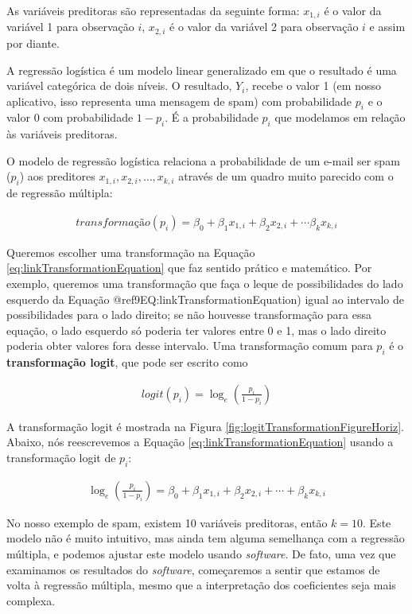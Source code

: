 \documentclass[
]{book}
\theoremstyle{definition}
\theoremstyle{definition}
\theoremstyle{definition}
\theoremstyle{definition}
\theoremstyle{remark}
\begin{document}
As variáveis preditoras são representadas da seguinte forma: \(x_{1,i}\) é o valor da variável 1 para observação \(i\), \(x_{2,i}\) é o valor da variável 2 para observação \(i\) e assim por diante.

A regressão logística é um modelo linear generalizado em que o resultado é uma variável categórica de dois níveis. O resultado, \(Y_i\), recebe o valor 1 (em nosso aplicativo, isso representa uma mensagem de spam) com probabilidade \(p_i\) e o valor 0 com probabilidade \(1-p_i\). É a probabilidade \(p_i\) que modelamos em relação às variáveis preditoras.

O modelo de regressão logística relaciona a probabilidade de um e-mail ser spam (\(p_i\)) aos preditores \(x_{1,i}, x_{2,i}, \dots, x_{k,i}\) através de um quadro muito parecido com o de regressão múltipla:

\begin{align}
transformação(p_{i}) = \beta_0 + \beta_1x_{1,i} + \beta_2 x_{2,i} + \cdots \beta_k x_{k,i}
\label{eq:linkTransformationEquation}
\end{align}

Queremos escolher uma transformação na Equação \eqref{eq:linkTransformationEquation} que faz sentido prático e matemático. Por exemplo, queremos uma transformação que faça o leque de possibilidades do lado esquerdo da Equação @ref9EQ:linkTransformationEquation) igual ao intervalo de possibilidades para o lado direito; se não houvesse transformação para essa equação, o lado esquerdo só poderia ter valores entre 0 e 1, mas o lado direito poderia obter valores fora desse intervalo. Uma transformação comum para \(p_i\) é o \textbf{transformação logit}, que pode ser escrito como

\begin{align*}
logit(p_i) = \log_{e}\left( \frac{p_i}{1-p_i} \right)
\end{align*}

A transformação logit é mostrada na Figura \ref{fig:logitTransformationFigureHoriz}. Abaixo, nós reescrevemos a Equação \eqref{eq:linkTransformationEquation} usando a transformação logit de \(p_i\):

\begin{align*}
\log_{e}\left( \frac{p_i}{1-p_i} \right)
    = \beta_0 + \beta_1 x_{1,i} + \beta_2 x_{2,i} + \cdots + \beta_k x_{k,i}
\end{align*}

No nosso exemplo de spam, existem 10 variáveis preditoras, então \(k=10\). Este modelo não é muito intuitivo, mas ainda tem alguma semelhança com a regressão múltipla, e podemos ajustar este modelo usando \emph{software}. De fato, uma vez que examinamos os resultados do \emph{software}, começaremos a sentir que estamos de volta à regressão múltipla, mesmo que a interpretação dos coeficientes seja mais complexa.
\end{document}
